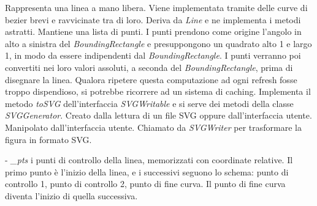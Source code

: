 Rappresenta una linea a mano libera. Viene implementata tramite delle curve di bezier brevi e ravvicinate tra di loro.
Deriva da \textit{Line} e ne implementa i metodi astratti. Mantiene una lista di punti. I punti prendono come origine l'angolo in alto a sinistra del \textit{BoundingRectangle} e presuppongono un quadrato alto 1 e largo 1, in modo da essere indipendenti dal \textit{BoundingRectangle}. I punti verranno poi convertiti nei loro valori assoluti, a seconda del \textit{BoundingRectangle}, prima di disegnare la linea. Qualora ripetere questa computazione ad ogni refresh fosse troppo dispendioso, si potrebbe ricorrere ad un sistema di caching. Implementa il metodo \textit{toSVG} dell'interfaccia \textit{SVGWritable} e si serve dei metodi della classe \textit{SVGGenerator}.
Creato dalla lettura di un file SVG oppure dall'interfaccia utente. Manipolato dall'interfaccia utente. Chiamato da \textit{SVGWriter} per trasformare la figura in formato SVG.
\begin{elencopuntato}[\normindent]
\item[-] \textit{{\_}pts} i punti di controllo della linea, memorizzati con coordinate relative. Il primo punto \`e l'inizio della linea, e i successivi seguono lo schema: punto di controllo 1, punto di controllo 2, punto di fine curva. Il punto di fine curva diventa l'inizio di quella successiva.
\end{elencopuntato}
